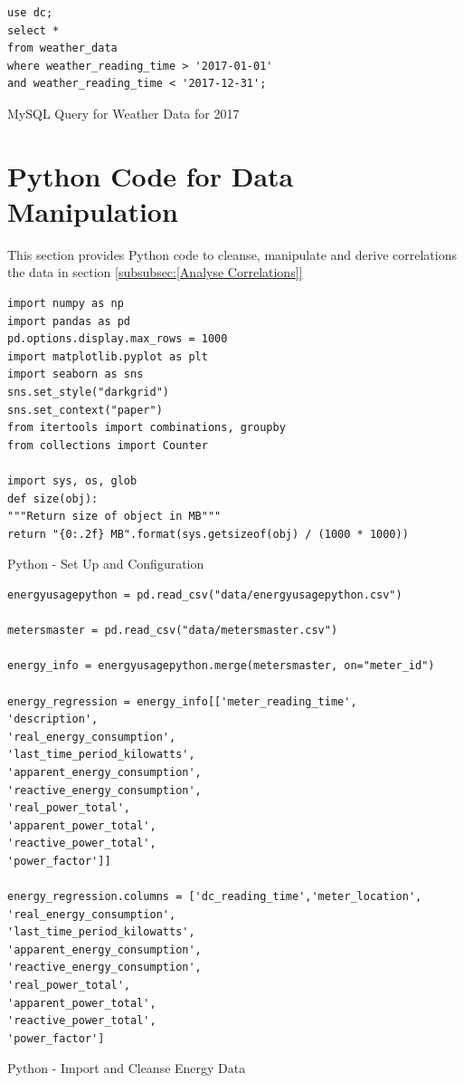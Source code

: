 \documentclass[12pt]{scrartcl}
\begin{document}
\begin{listing}[H]
\begin{verbatim}
use dc; 
select * 
from weather_data
where weather_reading_time > '2017-01-01'
and weather_reading_time < '2017-12-31';
\end{verbatim}
\caption{MySQL Query for Weather Data for 2017}
\label{list:[MySQL Query for Weather Data for 2017]}
\end{listing}

\section{Python Code for Data Manipulation}
\label{sec:[Python Code]}
This section provides Python code to cleanse, manipulate and derive correlations the data in section \ref{subsubsec:[Analyse Correlations]}

\begin{listing}[H]
\begin{verbatim}
import numpy as np
import pandas as pd
pd.options.display.max_rows = 1000
import matplotlib.pyplot as plt
import seaborn as sns
sns.set_style("darkgrid")
sns.set_context("paper")
from itertools import combinations, groupby
from collections import Counter

import sys, os, glob
def size(obj):
"""Return size of object in MB"""
return "{0:.2f} MB".format(sys.getsizeof(obj) / (1000 * 1000))
\end{verbatim}
\caption{Python - Set Up and Configuration}
\label{list:[Python - Set up and Configuration]}
\end{listing}

\begin{listing}[H]
\begin{verbatim}
energyusagepython = pd.read_csv("data/energyusagepython.csv")

metersmaster = pd.read_csv("data/metersmaster.csv")

energy_info = energyusagepython.merge(metersmaster, on="meter_id")

energy_regression = energy_info[['meter_reading_time',
'description',
'real_energy_consumption',
'last_time_period_kilowatts',
'apparent_energy_consumption',
'reactive_energy_consumption',
'real_power_total',
'apparent_power_total',
'reactive_power_total',
'power_factor']]

energy_regression.columns = ['dc_reading_time','meter_location',
'real_energy_consumption',
'last_time_period_kilowatts',
'apparent_energy_consumption',
'reactive_energy_consumption',
'real_power_total',
'apparent_power_total',
'reactive_power_total',
'power_factor']

\end{verbatim}
\caption{Python - Import and Cleanse Energy Data}
\label{list:[Python - Import and Cleanse Energy Data]}
\end{listing}
\end{document}

